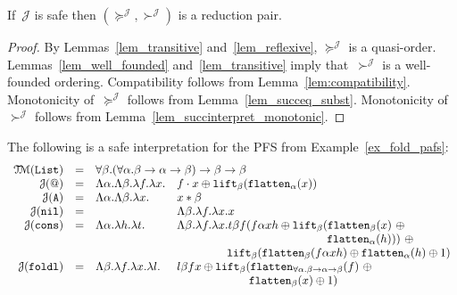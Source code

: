 \documentclass[a4paper,UKenglish,cleveref,autoref,numberwithinsect]{lipics-v2019}
\theoremstyle{definition}
\newcommand{\arrtype}{\rightarrow}
\newcommand{\quant}[2]{\forall #1.#2}
\newcommand{\abs}[2]{\lambda #1.#2}
\newcommand{\flatten}{\mathtt{flatten}}
\newcommand{\lift}{\mathtt{lift}}
\newcommand{\Typemap}{\mathcal{T\!M}}
\newcommand{\Termmap}{\mathcal{J}}
\newcommand{\succinterpret}{\succ^{\Termmap}}
\newcommand{\succeqinterpret}{\succeq^{\Termmap}}
\newcommand{\List}{\mathtt{List}}
\begin{document}
\begin{theorem}\label{thm_reduction_pair}
  If~$\Termmap$ is safe then $(\succeqinterpret,\succinterpret)$ is a
  reduction pair.
\end{theorem}

\begin{proof}
  By Lemmas~\ref{lem_transitive} and~\ref{lem_reflexive},
  $\succeqinterpret$ is a
  quasi-order. Lemmas~\ref{lem_well_founded}
  and~\ref{lem_transitive} imply that~$\succinterpret$ is a
  well-founded ordering. Compatibility follows from
  Lemma~\ref{lem:compatibility}. Monotonicity of~$\succeqinterpret$
  follows from Lemma~\ref{lem_succeq_subst}. Monotonicity
  of~$\succinterpret$ follows from
  Lemma~\ref{lem_succinterpret_monotonic}.
\end{proof}

\begin{example}\label{ex_fold_interpretation}
  The following is a safe interpretation for the PFS from
  Example~\ref{ex_fold_pafs}:
  \[
  \begin{array}{rcll}
    \Typemap(\List) & = & \multicolumn{2}{l}{
      \quant{\beta}{(\quant{\alpha}{\beta \arrtype
      \alpha \arrtype \beta}) \arrtype \beta \arrtype \beta}}\\
  \Termmap(\mathtt{@}) & = & \Lambda \alpha.\Lambda\beta.
    \lambda f.\lambda x. &
    f \cdot x \oplus \lift_\beta(\flatten_\alpha(x)) \\
  \Termmap(\mathtt{A}) & = & \Lambda \alpha.\Lambda \beta.\lambda x. &
    x * \beta \\
  \Termmap(\mathtt{nil}) & = & & \Lambda \beta.\lambda f.\abs{x}{x} \\
  \Termmap(\mathtt{cons}) & = & \Lambda \alpha.\lambda h.\lambda t. &
    \Lambda \beta.\lambda f.\lambda x.
    t \beta f (f \alpha x h \oplus \lift_\beta(\flatten_\beta(x)\
    \oplus \\
    & & & \phantom{ABCDEFGHIJKLMNOP,} \flatten_\alpha(h)))\ \oplus\  \\
    & & & \phantom{ABCDE\ }
    \lift_\beta(\flatten_\beta(f\alpha x h) \oplus
    \flatten_\alpha(h) \oplus 1) \\
  \Termmap(\mathtt{foldl}) & = & \Lambda \beta.\lambda f. \lambda x.
    \lambda l. & l \beta f x \oplus \lift_\beta(\flatten_{\forall \alpha.
    \beta \arrtype \alpha \arrtype \beta}(f)\ \oplus \\
    & & & \phantom{ABCDEFG\ \ }
    \flatten_\beta(x) \oplus 1) \\
  \end{array}
\]
\end{example}
\end{document}
